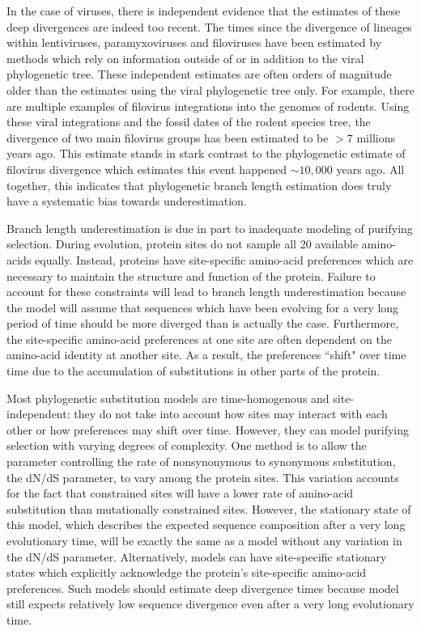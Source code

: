 \documentclass[11pt]{article}
\begin{document}
In the case of viruses, there is independent evidence that the estimates of these deep divergences are indeed too recent. 
The times since the divergence of lineages within lentiviruses, paramyxoviruses and filoviruses have been estimated by methods which rely on information outside of or in addition to the viral phylogenetic tree.  
These independent estimates are often orders of magnitude older than the estimates using the viral phylogenetic tree only. 
For example, there are multiple examples of filovirus integrations into the genomes of rodents. 
Using these viral integrations and the fossil dates of the rodent species tree, the divergence of two main filovirus groups has been estimated to be $>7$ millions years ago. 
This estimate stands in stark contrast to the phylogenetic estimate of filovirus divergence which estimates this event happened $\sim 10,000$ years ago. 
All together, this indicates that phylogenetic branch length estimation does truly have a systematic bias towards underestimation. 

Branch length underestimation is due in part to inadequate modeling of purifying selection. 
During evolution, protein sites do not sample all 20 available amino-acids equally. 
Instead, proteins have site-specific amino-acid preferences which are necessary to maintain the structure and function of the protein. 
Failure to account for these constraints will lead to branch length underestimation because the model will assume that sequences which have been evolving for a very long period of time should be more diverged than is actually the case. 
Furthermore, the site-specific amino-acid preferences at one site are often dependent on the amino-acid identity at another site. 
As a result, the preferences ``shift" over time time due to the accumulation of substitutions in other parts of the protein.  

Most phylogenetic substitution models are time-homogenous and site-independent: they do not take into account how sites may interact with each other or how preferences may shift over time. 
However, they can model purifying selection with varying degrees of complexity. 
One method is to allow the parameter controlling the rate of nonsynonymous to synonymous substitution, the dN/dS parameter, to vary among the protein sites. 
This variation accounts for the fact that constrained sites will have a lower rate of amino-acid substitution than mutationally constrained sites. 
However, the stationary state of this model, which describes the expected sequence composition after a very long evolutionary time, will be exactly the same as a model without any variation in the dN/dS parameter. 
Alternatively, models can have site-specific stationary states which explicitly acknowledge the protein's site-specific amino-acid preferences. 
Such models should estimate deep divergence times because model still expects relatively low sequence divergence even after a very long evolutionary time. 
\end{document}
